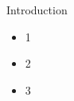 \documentclass{beamer}
\begin{document}
\begin{frame}{Introduction}
\begin{itemize}
\item 1
\item 2
\item 3
\end{itemize}
\end{frame}
\end{document}
